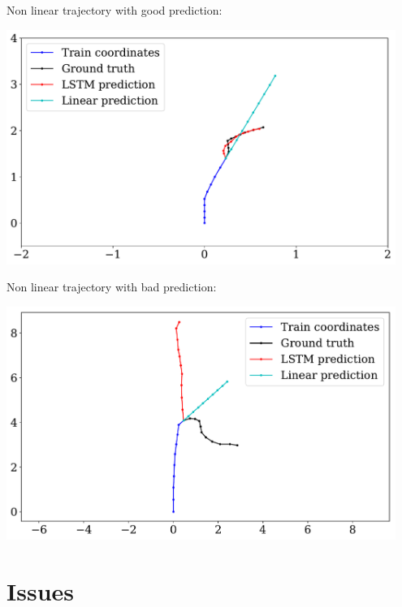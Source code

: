 \documentclass[a0,portrait]{a0poster}
\begin{document}
\begin{multicols}{2}
\begin{minipage}[]{0.495\linewidth}
Non linear trajectory with good prediction:\\
\centerline {\includegraphics[width=0.95\textwidth]{figure/fig_1552}}
\end{minipage}
\hfill
\begin{minipage}[]{0.495\linewidth}
Non linear trajectory with bad prediction:\\
\centerline {\includegraphics[width=0.95\textwidth]{figure/fig_1621}}
\end{minipage}


\section*{Issues}


\end{multicols}
\end{document}
